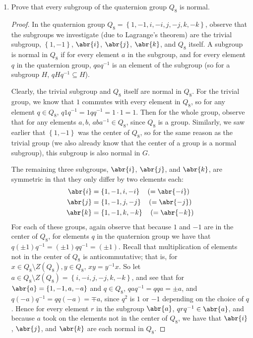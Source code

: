 \documentclass[11pt]{article}
\newcommand{\cbr}[1]{\left\{#1\right\}}
\begin{document}
\begin{enumerate}
    \item Prove that every subgroup of the quaternion group $Q_8$ is normal.
    \begin{proof}
        In the quaternion group $Q_8 = \cbr{1,-1,i,-i,j,-j,k,-k}$, observe that the subgroups we investigate (due to Lagrange's theorem) are the trivial subgroup, $\cbr{1,-1}$, $\abr{i}$, $\abr{j}$, $\abr{k}$, and $Q_8$ itself. A subgroup is normal in $Q_8$ if for every element $a$ in the subgroup, and for every element $q$ in the quaternion group, $qaq^{-1}$ is an element of the subgroup (so for a subgroup $H$, $qHq^{-1} \subseteq H$).
        
        Clearly, the trivial subgroup and $Q_8$ itself are normal in $Q_8$. For the trivial group, we know that $1$ commutes with every element in $Q_8$, so for any element $q \in Q_8$, $q1q^{-1} = 1qq^{-1} = 1\cdot 1 = 1$. Then for the whole group, observe that for any elements $a,b$, $aba^{-1}\in Q_8$, since $Q_8$ is a group. Similarly, we saw earlier that $\cbr{1,-1}$ was the center of $Q_8$, so for the same reason as the trivial group (we also already know that the center of a group is a normal subgroup), this subgroup is also normal in $G$.

        The remaining three subgroups, $\abr{i}$, $\abr{j}$, and $\abr{k}$, are symmetric in that they only differ by two elements each: \begin{align*}
            \abr{i} &= \cbr{1,-1,i,-i} \quad(= \abr{-i})\\
            \abr{j} &= \cbr{1,-1,j,-j} \quad(= \abr{-j})\\
            \abr{k} &= \cbr{1,-1,k,-k} \quad(= \abr{-k})
        \end{align*}
        For each of these groups, again observe that because $1$ and $-1$ are in the center of $Q_8$, for elements $q$ in the quaternion group we have that $q(\pm1)q^{-1} = (\pm1)qq^{-1} = (\pm1)$. Recall that multiplication of elements not in the center of $Q_8$ is anticommutative; that is, for $x\in Q_8\setminus Z(Q_8), y\in Q_8$, $xy = y^{-1}x$. So let $a\in Q_8\setminus Z(Q_8) = \cbr{i,-i,j,-j,k,-k}$, and see that for $\abr{a} = \cbr{1,-1,a,-a}$ and $q\in Q_8$, $qaq^{-1} = qqa = \pm a$, and $q(-a)q^{-1} = qq(-a) = \mp a$, since $q^2$ is $1$ or $-1$ depending on the choice of $q$. Hence for every element $r$ in the subgroup $\abr{a}$, $qrq^{-1}\in \abr{a}$, and because $a$ took on the elements not in the center of $Q_8$, we have that $\abr{i}$, $\abr{j}$, and $\abr{k}$ are each normal in $Q_8$.


\end{proof}
\end{enumerate}
\end{document}
